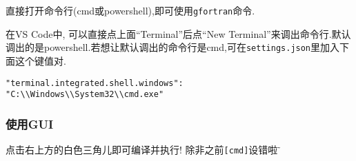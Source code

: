 直接打开命令行(cmd或powershell),即可使用\verb|gfortran|命令.

在VS Code中, 可以直接点上面``Terminal''后点``New Terminal''来调出命令行.默认调出的是powershell.若想让默认调出的命令行是cmd,可在\verb|settings.json|里加入下面这个键值对.
\begin{verbatim}
"terminal.integrated.shell.windows":
"C:\\Windows\\System32\\cmd.exe"
\end{verbatim}

\subsubsection{使用GUI}
点击右上方的白色三角儿即可编译并执行! 除非之前\verb|[cmd]|设错啦$\!\text{\~{}}$

